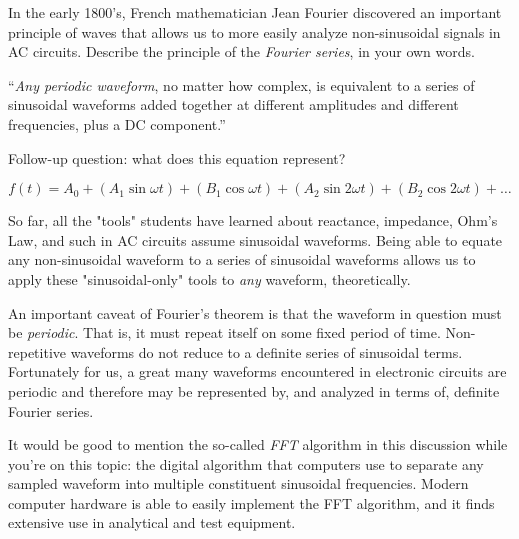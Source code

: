 

In the early 1800's, French mathematician Jean Fourier discovered an important principle of waves that allows us to more easily analyze non-sinusoidal signals in AC circuits.  Describe the principle of the {\it Fourier series}, in your own words.







\vskip 10pt {\narrower \noindent \baselineskip5pt

``{\it Any periodic waveform}, no matter how complex, is equivalent to a series of sinusoidal waveforms added together at different amplitudes and different frequencies, plus a DC component.''

\par} \vskip 10pt

\vskip 10pt

Follow-up question: what does this equation represent?

$$f(t) = A_0 + (A_1 \sin \omega t) + (B_1 \cos \omega t) + (A_2 \sin 2 \omega t) + (B_2 \cos 2 \omega t) + \dots$$







So far, all the "tools" students have learned about reactance, impedance, Ohm's Law, and such in AC circuits assume sinusoidal waveforms.  Being able to equate any non-sinusoidal waveform to a series of sinusoidal waveforms allows us to apply these "sinusoidal-only" tools to {\it any} waveform, theoretically.

An important caveat of Fourier's theorem is that the waveform in question must be {\it periodic}.  That is, it must repeat itself on some fixed period of time.  Non-repetitive waveforms do not reduce to a definite series of sinusoidal terms.  Fortunately for us, a great many waveforms encountered in electronic circuits are periodic and therefore may be represented by, and analyzed in terms of, definite Fourier series.

It would be good to mention the so-called {\it FFT} algorithm in this discussion while you're on this topic: the digital algorithm that computers use to separate any sampled waveform into multiple constituent sinusoidal frequencies.  Modern computer hardware is able to easily implement the FFT algorithm, and it finds extensive use in analytical and test equipment.




